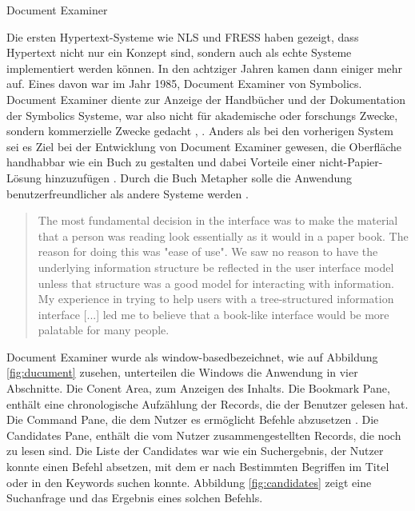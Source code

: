 \begin{section}{Document Examiner}
\label{sec:DocumentExaminer}

Die ersten Hypertext-Systeme wie NLS und FRESS haben gezeigt, dass Hypertext nicht nur ein Konzept sind, sondern auch als echte Systeme implementiert werden können. In den achtziger Jahren kamen dann einiger mehr auf. Eines davon war im Jahr 1985, Document Examiner von Symbolics. Document Examiner diente zur Anzeige der Handbücher und der Dokumentation der Symbolics Systeme, war also nicht für akademische oder forschungs Zwecke, sondern kommerzielle Zwecke gedacht \cite{Walker1987}, \cite[S. 50]{Nielsen1995}. Anders als bei den vorherigen System sei es Ziel bei der Entwicklung von  Document Examiner gewesen, die Oberfläche handhabbar wie ein Buch zu gestalten und dabei Vorteile einer nicht-Papier-Lösung hinzuzufügen \cite{Walker1987}. Durch die Buch Metapher solle die Anwendung benutzerfreundlicher als andere Systeme werden \cite{Walker1987}. 

\begin{quote}
\glqq The most fundamental decision in the interface was to make the material that a person was reading look essentially as it would in a paper book. The reason for doing this was "ease of use". We saw no reason to have the underlying information structure be reflected in the user interface model unless that structure was a good model for interacting with information. My experience in trying to help users with a tree-structured information interface [...] led me to believe that a book-like interface would be more palatable for many people. \grqq{ }\cite{Walker1987}
\end{quote}

Document Examiner wurde als \glqq window-based\grqq{ }bezeichnet, wie auf Abbildung \ref{fig:ducument} zusehen, unterteilen die Windows die Anwendung in vier Abschnitte. Die Conent Area, zum Anzeigen des Inhalts. Die Bookmark Pane, enthält eine chronologische Aufzählung der Records, die der Benutzer gelesen hat. Die Command Pane, die dem Nutzer es ermöglicht Befehle abzusetzen \cite{Walker1987}. Die Candidates Pane, enthält die vom Nutzer zusammengestellten Records, die noch zu lesen sind. Die Liste der Candidates war wie ein Suchergebnis, der Nutzer konnte einen Befehl absetzen, mit dem er nach Bestimmten Begriffen im Titel oder in den Keywords suchen konnte. Abbildung \ref{fig:candidates} zeigt eine Suchanfrage und das Ergebnis eines solchen Befehls.


\end{section}
